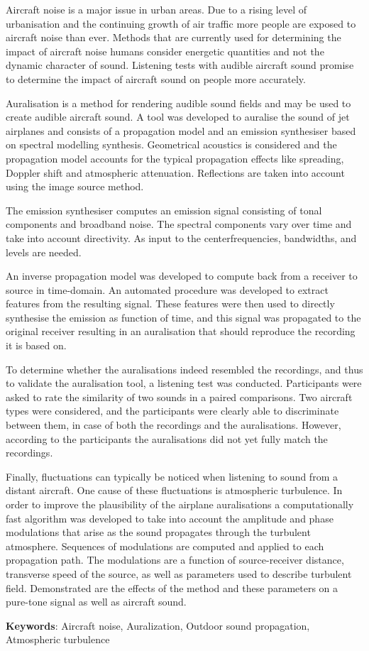 Aircraft noise is a major issue in urban areas. Due to a rising level of
urbanisation and the continuing growth of air traffic more people are exposed to
aircraft noise than ever. Methods that are currently used for determining the
impact of aircraft noise humans consider energetic quantities and not the
dynamic character of sound. Listening tests with audible aircraft sound promise
to determine the impact of aircraft sound on people more accurately.

Auralisation is a method for rendering audible sound fields and may be used to
create audible aircraft sound. A tool was developed to auralise the sound of jet
airplanes and consists of a propagation model and an emission synthesiser based
on spectral modelling synthesis. Geometrical acoustics is considered and the
propagation model accounts for the typical propagation effects like spreading,
Doppler shift and atmospheric attenuation. Reflections are taken into account
using the image source method.

The emission synthesiser computes an emission signal consisting of tonal
components and broadband noise. The spectral components vary over time and take
into account directivity. As input to the centerfrequencies, bandwidths, and
levels are needed.

An inverse propagation model was developed to compute back from a receiver to
source in time-domain. An automated procedure was developed to extract features
from the resulting signal. These features were then used to directly synthesise
the emission as function of time, and this signal was propagated to the original
receiver resulting in an auralisation that should reproduce the recording
it is based on.

To determine whether the auralisations indeed resembled the recordings, and thus
to validate the auralisation tool, a listening test was conducted. Participants
were asked to rate the similarity of two sounds in a paired comparisons. Two
aircraft types were considered, and the participants were clearly able to
discriminate between them, in case of both the recordings and the auralisations.
However, according to the participants the auralisations did not yet fully match
the recordings.


Finally, fluctuations can typically be noticed when listening to sound from a
distant aircraft. One cause of these fluctuations is atmospheric turbulence. In
order to improve the plausibility of the airplane auralisations a
computationally fast algorithm was developed to take into account the amplitude
and phase modulations that arise as the sound propagates through the turbulent
atmosphere. Sequences of modulations are computed and applied to each
propagation path. The modulations are a function of source-receiver distance,
transverse speed of the source, as well as parameters used to describe turbulent
field. Demonstrated are the effects of the method and these parameters on a
pure-tone signal as well as aircraft sound.



\vspace{0.1cm}

\textbf{Keywords}: Aircraft noise, Auralization, Outdoor sound propagation, Atmospheric turbulence
